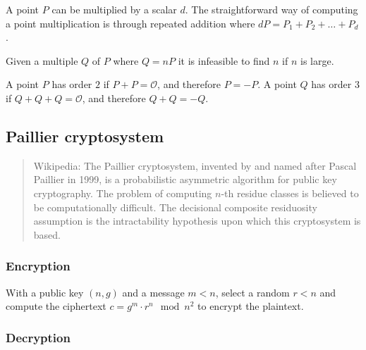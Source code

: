 A point $P$ can be multiplied by a scalar $d$. The straightforward way of
computing a point multiplication is through repeated addition where $dP = P_1 +
P_2 + \dots + P_d$.



\begin{lemma}
  Given a multiple $Q$ of $P$ where $Q = nP$ it is infeasible to find $n$ if $n$ is large.
\end{lemma}

\begin{lemma}
  A point $P$ has order $2$ if $P + P = \mathcal{O}$, and therefore $P = -P$.
  A point $Q$ has order $3$ if $Q+Q+Q=\mathcal{O}$, and therefore $Q + Q = -Q$.
\end{lemma}


\subsection{Paillier cryptosystem}

\begin{quote}{Wikipedia:}
  The Paillier cryptosystem, invented by and named after Pascal Paillier in 1999,
  is a probabilistic asymmetric algorithm for public key cryptography. The problem
  of computing $n$-th residue classes is believed to be computationally difficult.
  The decisional composite residuosity assumption is the intractability hypothesis
  upon which this cryptosystem is based.
\end{quote}

\subsubsection{Encryption}

With a public key $(n, g)$ and a message $m < n$, select a random $r < n$ and
compute the ciphertext $c = g^m \cdot r^n \mod n^2$ to encrypt the plaintext.

\subsubsection{Decryption}

